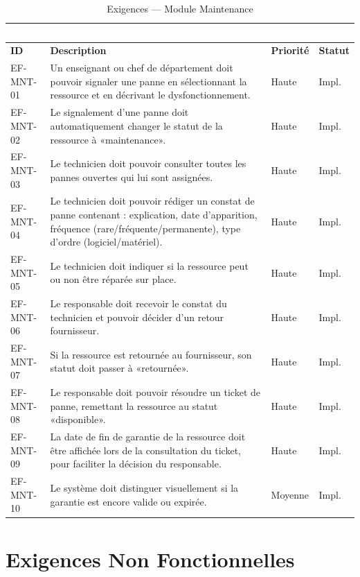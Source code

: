 \documentclass[12pt,a4paper]{report}
\begin{document}
\begin{longtable}{|C{1.8cm}|L{8.5cm}|C{2cm}|C{2cm}|}
\caption{Exigences — Module Maintenance} \\
\hline
{}\textcolor{white}{\textbf{ID}} & \textcolor{white}{\textbf{Description}} & \textcolor{white}{\textbf{Priorité}} & \textcolor{white}{\textbf{Statut}} \\
\hline
\endfirsthead
\hline
\textbf{ID} & \textbf{Description} & \textbf{Priorité} & \textbf{Statut} \\
\hline
\endhead
EF-MNT-01 & Un enseignant ou chef de département doit pouvoir signaler une panne en sélectionnant la ressource et en décrivant le dysfonctionnement. & Haute & Impl. \\
\hline
EF-MNT-02 & Le signalement d'une panne doit automatiquement changer le statut de la ressource à «maintenance». & Haute & Impl. \\
\hline
EF-MNT-03 & Le technicien doit pouvoir consulter toutes les pannes ouvertes qui lui sont assignées. & Haute & Impl. \\
\hline
EF-MNT-04 & Le technicien doit pouvoir rédiger un constat de panne contenant : explication, date d'apparition, fréquence (rare/fréquente/permanente), type d'ordre (logiciel/matériel). & Haute & Impl. \\
\hline
EF-MNT-05 & Le technicien doit indiquer si la ressource peut ou non être réparée sur place. & Haute & Impl. \\
\hline
EF-MNT-06 & Le responsable doit recevoir le constat du technicien et pouvoir décider d'un retour fournisseur. & Haute & Impl. \\
\hline
EF-MNT-07 & Si la ressource est retournée au fournisseur, son statut doit passer à «retournée». & Haute & Impl. \\
\hline
EF-MNT-08 & Le responsable doit pouvoir résoudre un ticket de panne, remettant la ressource au statut «disponible». & Haute & Impl. \\
\hline
EF-MNT-09 & La date de fin de garantie de la ressource doit être affichée lors de la consultation du ticket, pour faciliter la décision du responsable. & Haute & Impl. \\
\hline
EF-MNT-10 & Le système doit distinguer visuellement si la garantie est encore valide ou expirée. & Moyenne & Impl. \\
\hline
\end{longtable}

\chapter{Exigences Non Fonctionnelles}
\end{document}
